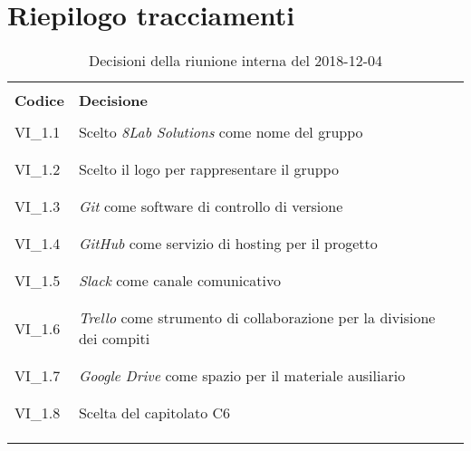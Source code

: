 \section{Riepilogo tracciamenti}
\begin{centering}
\begin{longtable}{ >{\centering}p{4cm} >{\centering}p{11cm} }

\hline
\\[0.5pt]
	\textbf{Codice} & \textbf{Decisione} 
	
	\tabularnewline 
	\hline
	
	
				\\[0.5pt]
				VI\_1.1 & Scelto \textit{8Lab Solutions} come nome del gruppo
				\\[0.5pt]
				\tabularnewline
				\hline
						
				\\[0.5pt]
				VI\_1.2 & Scelto il logo per rappresentare il gruppo
				\\[0.5pt]
				\tabularnewline
				\hline
				
				\\[0.5pt]
				VI\_1.3 & \textit{Git} come software di controllo di versione
				\\[0.5pt]
				\tabularnewline
				\hline
				
				\\[0.5pt]				
				VI\_1.4 & \textit{GitHub} come servizio di hosting per il progetto
				\\[0.5pt]
				\tabularnewline
				\hline
				
				\\[0.5pt]
				VI\_1.5 & \textit{Slack} come canale comunicativo 
				\\[0.5pt]
				\tabularnewline
				\hline
				
				\\[0.5pt]
				VI\_1.6 & \textit{Trello} come strumento di collaborazione per la divisione 
				dei compiti
				\\[0.5pt]
				\tabularnewline
				\hline
		
				\\[0.5pt]
				VI\_1.7 & \textit{Google Drive} come spazio per il materiale ausiliario
				\\[0.5pt]
				\tabularnewline
				\hline
			
				\\[0.5pt]
				VI\_1.8 & Scelta del capitolato C6
				\\[0.5pt]
				\tabularnewline
              	\hline 
           	
                
        \\[0.7pt]
        \caption{Decisioni della riunione interna del 2018-12-04}
\end{longtable}
\end{centering}

